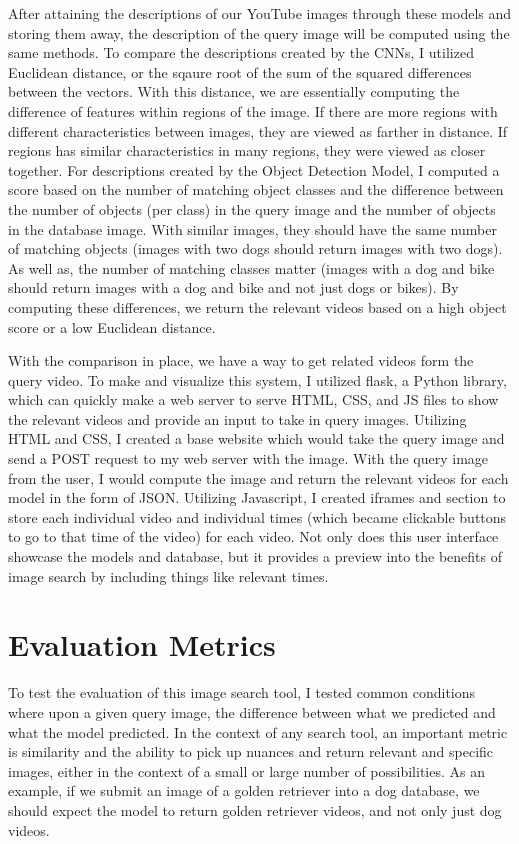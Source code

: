 \documentclass[10pt,twocolumn]{article}
\begin{document}
After attaining the descriptions of our YouTube images through these models and storing them away, the description of the query image will be computed using the same methods. To compare the descriptions created by the CNNs, I utilized Euclidean distance, or the sqaure root of the sum of the squared differences between the vectors. With this distance, we are essentially computing the difference of features within regions of the image. If there are more regions with different characteristics between images, they are viewed as farther in distance. If regions has similar characteristics in many regions, they were viewed as closer together. For descriptions created by the Object Detection Model, I computed a score based on the number of matching object classes and the difference between the number of objects (per class) in the query image and the number of objects in the database image. With similar images, they should have the same number of matching objects (images with two dogs should return images with two dogs). As well as, the number of matching classes matter (images with a dog and bike should return images with a dog and bike and not just dogs or bikes). By computing these differences, we return the relevant videos based on a high object score or a low Euclidean distance. 

With the comparison in place, we have a way to get related videos form the query video. To make and visualize this system, I utilized flask, a Python library, which can quickly make a web server to serve HTML, CSS, and JS files to show the relevant videos and provide an input to take in query images. Utilizing HTML and CSS, I created a base website which would take the query image and send a POST request to my web server with the image. With the query image from the user, I would compute the image and return the relevant videos for each model in the form of JSON. Utilizing Javascript, I created iframes and section to store each individual video and individual times (which became clickable buttons to go to that time of the video) for each video. Not only does this user interface showcase the models and database, but it provides a preview into the benefits of image search by including things like relevant times. 

\section{Evaluation Metrics}

To test the evaluation of this image search tool, I tested common conditions where upon a given query image, the difference between what we predicted and what the model predicted. In the context of any search tool, an important metric is similarity and the ability to pick up nuances and return relevant and specific images, either in the context of a small or large number of possibilities. As an example, if we submit an image of a golden retriever into a dog database, we should expect the model to return golden retriever videos, and not only just dog videos.
\end{document}
